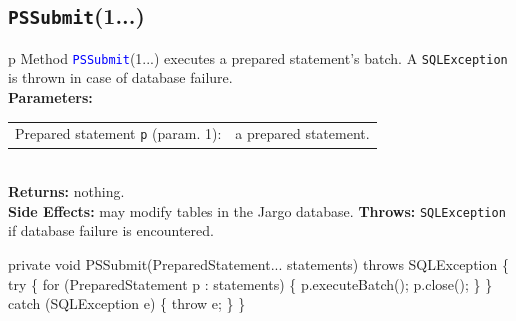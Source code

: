 \documentclass{article}
\def\nwendcode{\endtrivlist \endgroup}      %
\let\nwdocspar=\par
\theoremstyle{definition}                   %
\begin{document}
\subsection{{\tt{}\protect{}PSSubmit}(1...)}
\begin{tabular}{p{\textwidth}}
\toprule
{}
Method \textcolor{blue}{{\tt{}\protect{}PSSubmit}}(1...) executes a prepared statement's batch.
A {\tt{}SQLException} is thrown in case of database failure.\\
\midrule
\textbf{Parameters:} \\
\begin{tabular}{lp{116mm}}
Prepared statement {\tt{}p} (param. 1):&a prepared statement.
\end{tabular}\\
\textbf{Returns:} nothing.\\
\textbf{Side Effects:} may modify tables in the Jargo database.
\textbf{Throws:} {\tt{}SQLException} if database failure is encountered.\\
\bottomrule
\end{tabular}
\nwenddocs{}\endmoddef{}
private void PSSubmit(PreparedStatement... statements) throws SQLException \{
  try \{
    for (PreparedStatement p : statements) \{
      p.executeBatch();
      p.close();
    \}
  \} catch (SQLException e) \{
    throw e;
  \}
\}
\eatline
{}\nwendcode{}\nwdocspar
\end{document}
